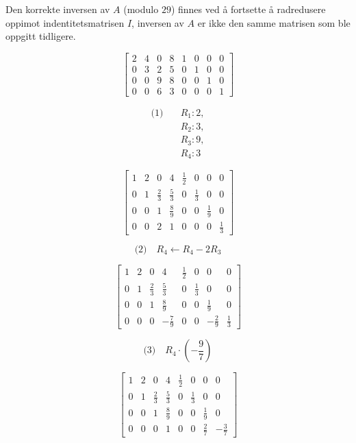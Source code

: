 \documentclass[12pt,a4paper]{article}
\begin{document}
Den korrekte inversen av $A$ (modulo $29$) finnes ved å fortsette å radredusere oppimot indentitetsmatrisen $I$,  inversen av $A$ er ikke den samme matrisen som ble oppgitt tidligere.


\[
\left[
\begin{array}{cccc|cccc}
2 & 4 & 0 & 8 & 1 & 0 & 0 & 0 \\
0 & 3 & 2 & 5 & 0 & 1 & 0 & 0 \\
0 & 0 & 9 & 8 & 0 & 0 & 1 & 0 \\
0 & 0 & 6 & 3 & 0 & 0 & 0 & 1
\end{array}
\right]
\]



\[ \begin{aligned} \text{(1)}\quad & R_1 : 2, \\ & R_2 : 3, \\ & R_3 : 9, \\ & R_4 : 3 \end{aligned} \]


\[
\left[
\begin{array}{cccc|cccc}
1 & 2 & 0 & 4 & \tfrac12 & 0 & 0 & 0 \\
0 & 1 & \tfrac{2}{3} & \tfrac{5}{3} & 0 & \tfrac13 & 0 & 0 \\
0 & 0 & 1 & \tfrac{8}{9} & 0 & 0 & \tfrac19 & 0 \\
0 & 0 & 2 & 1 & 0 & 0 & 0 & \tfrac13
\end{array}
\right]
\]

\[ \text{(2)}\quad R_4 \leftarrow R_4 - 2R_3 \]

\[
\left[
\begin{array}{cccc|cccc}
1 & 2 & 0 & 4 & \tfrac12 & 0 & 0 & 0 \\
0 & 1 & \tfrac{2}{3} & \tfrac{5}{3} & 0 & \tfrac13 & 0 & 0 \\
0 & 0 & 1 & \tfrac{8}{9} & 0 & 0 & \tfrac19 & 0 \\
0 & 0 & 0 & -\tfrac{7}{9} & 0 & 0 & -\tfrac{2}{9} & \tfrac13
\end{array}
\right]
\]


\[ \text{(3)}\quad R_4 \cdot \left(-\frac{9}{7}\right) \]



\[
\left[
\begin{array}{cccc|cccc}
1 & 2 & 0 & 4 & \tfrac12 & 0 & 0 & 0 \\
0 & 1 & \tfrac{2}{3} & \tfrac{5}{3} & 0 & \tfrac13 & 0 & 0 \\
0 & 0 & 1 & \tfrac{8}{9} & 0 & 0 & \tfrac19 & 0 \\
0 & 0 & 0 & 1 & 0 & 0 & \tfrac{2}{7} & -\tfrac{3}{7}
\end{array}
\right]
\]
\end{document}

